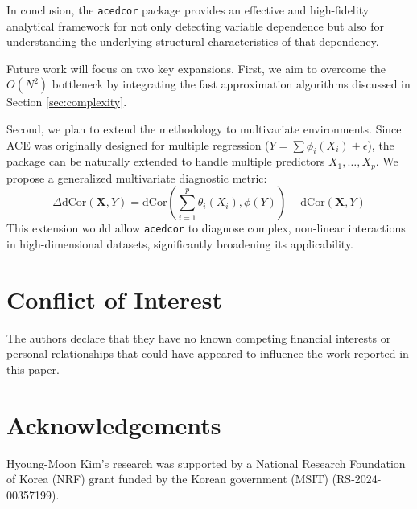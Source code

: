 \documentclass[a4paper,fleqn]{cas-sc}
\newcommand{\dCor}{\mathrm{dCor}}
\begin{document}
In conclusion, the \texttt{acedcor} package provides an effective and high-fidelity analytical framework for not only detecting variable dependence but also for understanding the underlying structural characteristics of that dependency.

Future work will focus on two key expansions. First, we aim to overcome the $O(N^2)$ bottleneck by integrating the fast approximation algorithms discussed in Section \ref{sec:complexity}.

Second, we plan to extend the methodology to multivariate environments. Since ACE was originally designed for multiple regression ($Y = \sum \phi_i(X_i) + \epsilon$), the package can be naturally extended to handle multiple predictors $X_1, \dots, X_p$. We propose a generalized multivariate diagnostic metric:
$$ \Delta\dCor(\mathbf{X}, Y) = \dCor\left(\sum_{i=1}^p \theta_i(X_i), \phi(Y)\right) - \dCor(\mathbf{X}, Y) $$
This extension would allow \texttt{acedcor} to diagnose complex, non-linear interactions in high-dimensional datasets, significantly broadening its applicability.

\raggedright
\justify


\section*{Conflict of Interest}
The authors declare that they have no known competing financial interests or personal relationships that could have appeared to influence the work reported in this paper.

\section*{Acknowledgements}
\label{sec:ack}
Hyoung-Moon Kim's research was supported by a National Research Foundation of Korea (NRF) grant funded by
the Korean government (MSIT) (RS-2024-00357199).

\printcredits


\end{document}
